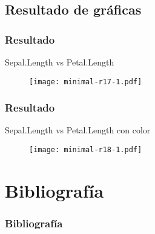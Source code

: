 \documentclass[11pt]{beamer}					%
\begin{document}
			
			
		
\subsection{Resultado de gráficas}			
		 \begin{frame}[fragile]						%
			\frametitle{Resultado}
		\begin{block}{Sepal.Length vs Petal.Length}
					\begin{figure}[htb]
					\centering
					\texttt{[image: minimal-r17-1.pdf]}
					 \label{fig:libro2}
				\end{figure}
				\end{block}

		\end{frame}

	 \begin{frame}[fragile]						%
			\frametitle{Resultado}
		\begin{block}{Sepal.Length vs Petal.Length con color}
					\begin{figure}[htb]
					\centering
					\texttt{[image: minimal-r18-1.pdf]}
					\label{fig:libro3}
				\end{figure}
				\end{block}
		\end{frame}


\section{Bibliografía}	
	\begin{frame}[fragile]
		\frametitle{Bibliografía} 		
       	\nocite{*}				%
	\end{frame}		
				
\end{document}
